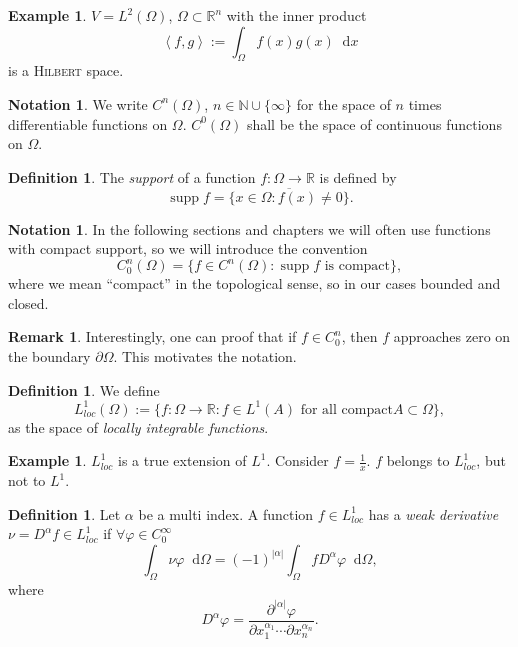 \documentclass[12pt,a4paper,twoside, open=right]{scrreprt}
\theoremstyle{definition}
\newtheorem{rem}[auf]{Remark}
\newtheorem{defn}[auf]{Definition}
\newtheorem{bsp}[auf]{Example}
\newtheorem{notation}[auf]{Notation}
\theoremstyle{plain}
\DeclareMathOperator{\supp}{supp} %
\newcommand{\abs}[1]{\left\vert #1\right\vert}
\newcommand{\dotp}[2]{\left\langle #1,#2\right\rangle}
\newcommand{\rr}{\mathbb{R}}
\newcommand{\nn}{\mathbb{N}}
\newcommand{\D}{\mathop{}\!\mathrm{d}}
\begin{document}
\begin{bsp}
    $V=L^2(\Omega)$, $\Omega\subset\rr^n$ with the inner product
    \begin{equation}
       \dotp{f}{g}:=\int_\Omega f(x)g(x)\D x
    \end{equation}
    is a \textsc{Hilbert} space.
\end{bsp}
\begin{notation}
    We write $C^n(\Omega)$, $n\in\nn\cup\{\infty\}$ for the space of $n$ times differentiable functions on $\Omega$. $C^0(\Omega)$ shall be the space of continuous functions on $\Omega$.
\end{notation}
\begin{defn}
    The \emph{support} of a function $f\colon \Omega\to\rr$ is defined by 
    \begin{equation}
        \supp f = \overline{\{x\in\Omega\colon f(x)\neq 0\}}.
    \end{equation}
\end{defn}
\begin{notation}
    In the following sections and chapters we will often use functions with compact support, so we will introduce the convention
    \begin{equation}
        C^n_0(\Omega)=\{f\in C^n(\Omega)\colon \supp f \text{ is compact} \},
    \end{equation}
    where we mean \enquote{compact} in the topological sense, so in our cases bounded and closed.
\end{notation}
\begin{rem}
    Interestingly, one can proof that if $f\in C^n_0$, then $f$ approaches zero on the boundary $\partial\Omega$. This motivates the notation.
\end{rem}
\begin{defn}
    We define 
    \begin{equation}
        L^1_{loc}(\Omega):=\{f\colon\Omega\to\rr\colon f\in L^1(A) \text{ for all compact} A\subset\Omega \},
    \end{equation}
    as the space of \emph{locally integrable functions}.
\end{defn}
\begin{bsp}
    $L^1_{loc}$ is a true extension of $L^1$. Consider $f=\frac{1}{x}$. $f$ belongs to $L^1_{loc}$, but not to $L^1$. 
\end{bsp}
\begin{defn}
    \label{defn:weakderivative}
    Let $\alpha$ be a multi index. A function $f\in L^1_{loc}$ has a \emph{weak derivative} $\nu=D^\alpha f\in L^1_{loc}$ if $\forall \varphi\in C_0^\infty$
    \begin{equation}
        \int_\Omega\nu\varphi\D\Omega = (-1)^{\abs{\alpha}}\int_\Omega fD^\alpha\varphi \D\Omega,
    \end{equation}
    where 
    \begin{equation}
        D^\alpha\varphi=\frac{\partial^{\abs{\alpha}}\varphi}{\partial x_1^{\alpha_1}\dotsb\partial x_n^{\alpha_n}}.
    \end{equation}
\end{defn}
\end{document}
